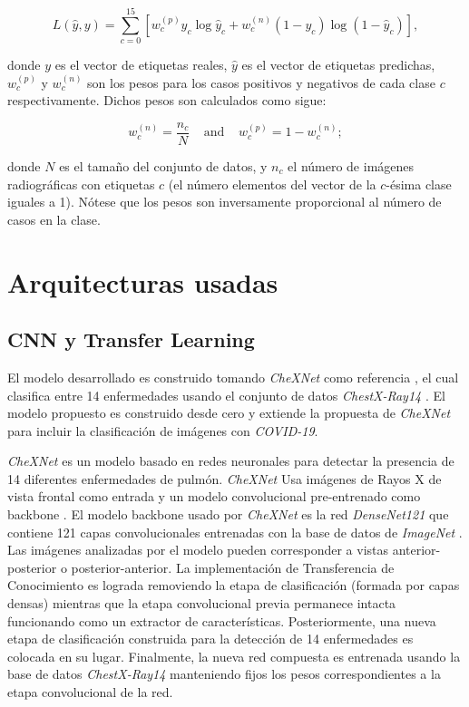 {\begin{equation} \label{eq:loss}
    L(\hat y, y) = \sum_{c=0}^{15} \left[ w_c^{(p)} y_c \log \hat y_c + w_c^{(n)} (1-y_c) \log (1- \hat y_c) \right],
\end{equation}

donde $y$ es el vector de etiquetas reales, $\hat y$ es el vector de etiquetas predichas,
$w_c^{(p)}$ y $w_c^{(n)}$ son los pesos para los casos positivos y negativos de cada clase $c$
respectivamente. Dichos pesos son calculados como sigue:

\begin{equation}\label{eq:weights}
    w_c^{(n)} = \frac{n_c}{N} \;\;\;\; \text{and} \;\;\;\; w_c^{(p)} = 1-  w_c^{(n)};
\end{equation}

donde $N$ es el tamaño del conjunto de datos, y $n_c$ el número de imágenes radiográficas con
etiquetas $c$ (el número elementos del vector de la $c$-ésima clase iguales a 1). Nótese que los
pesos son inversamente proporcional al número de casos en la clase.


\section{Arquitecturas usadas}

\subsection{CNN y Transfer Learning}

El modelo desarrollado es construido tomando \textit{CheXNet} como referencia
\cite{rajpurkar2018deep}, el cual clasifica entre 14 enfermedades
usando el conjunto de datos \textit{ChestX-Ray14} \cite{wang2017chestx}. El modelo propuesto es
construido desde cero y extiende la propuesta de \textit{CheXNet} para incluir la clasificación de
imágenes con \textit{COVID-19}.

\textit{CheXNet} es un modelo basado en redes neuronales para detectar la presencia de 14 diferentes
enfermedades de pulmón. \textit{CheXNet} Usa imágenes de Rayos X de vista frontal como entrada y
un modelo convolucional pre-entrenado como backbone \cite{rajpurkar2018deep}. El modelo backbone usado
por \textit{CheXNet} es la red \textit{DenseNet121} \cite{huang2017densely} que contiene 121 capas
convolucionales entrenadas con la base de datos de \textit{ImageNet} \cite{ILSVRC15}. Las imágenes
analizadas por el modelo pueden corresponder a vistas anterior-posterior o posterior-anterior. La
implementación de Transferencia de Conocimiento es lograda removiendo la etapa de clasificación
(formada por capas densas) mientras que la etapa convolucional previa permanece intacta funcionando
como un extractor de características. Posteriormente, una nueva etapa de clasificación construida
para la detección de 14 enfermedades es colocada en su lugar. Finalmente, la nueva red compuesta
es entrenada usando la base de datos \textit{ChestX-Ray14} manteniendo fijos los pesos
correspondientes a la etapa convolucional de la red.

}
